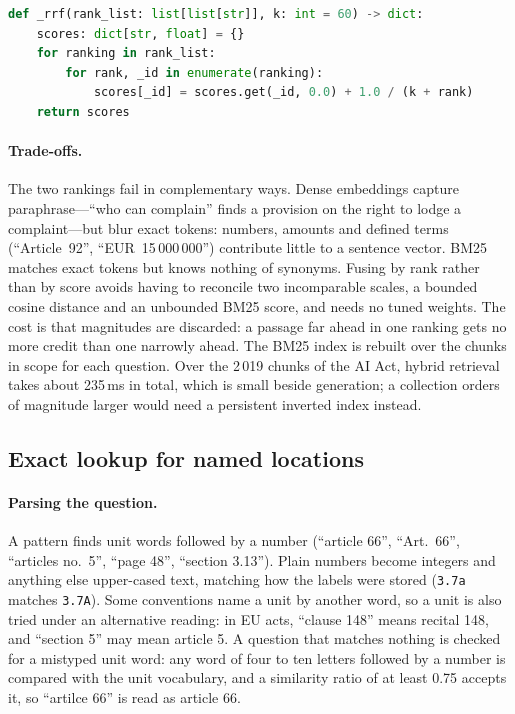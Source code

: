 \begin{lstlisting}[float, language=Python, caption={Reciprocal rank fusion
(\texttt{retrieval/hybrid.py}).}, label={lst:rrf}]
def _rrf(rank_list: list[list[str]], k: int = 60) -> dict:
    scores: dict[str, float] = {}
    for ranking in rank_list:
        for rank, _id in enumerate(ranking):
            scores[_id] = scores.get(_id, 0.0) + 1.0 / (k + rank)
    return scores
\end{lstlisting}

\paragraph{Trade-offs.} The two rankings fail in complementary ways. Dense
embeddings capture paraphrase---``who can complain'' finds a provision on the
right to lodge a complaint---but blur exact tokens: numbers, amounts and
defined terms (``Article~92'', ``EUR~15\,000\,000'') contribute little to a
sentence vector. BM25 matches exact tokens but knows nothing of synonyms.
Fusing by rank rather than by score avoids having to reconcile two
incomparable scales, a bounded cosine distance and an unbounded BM25 score,
and needs no tuned weights. The cost is that magnitudes are discarded: a
passage far ahead in one ranking gets no more credit than one narrowly ahead.
The BM25 index is rebuilt over the chunks in scope for each question. Over the
2\,019 chunks of the AI Act, hybrid retrieval takes about 235\,ms in total,
which is small beside generation; a collection orders of magnitude larger
would need a persistent inverted index instead.

\subsection{Exact lookup for named locations}

\paragraph{Parsing the question.} A pattern finds unit words followed by a
number (``article 66'', ``Art.~66'', ``articles no.~5'', ``page 48'',
``section 3.13''). Plain numbers become integers and anything else upper-cased
text, matching how the labels were stored (\texttt{3.7a} matches
\texttt{3.7A}). Some conventions name a unit by another word, so a unit is
also tried under an alternative reading: in EU acts, ``clause 148'' means
recital 148, and ``section 5'' may mean article 5. A question that matches
nothing is checked for a mistyped unit word: any word of four to ten letters
followed by a number is compared with the unit vocabulary, and a similarity
ratio of at least 0.75 accepts it, so ``artilce 66'' is read as article 66.

